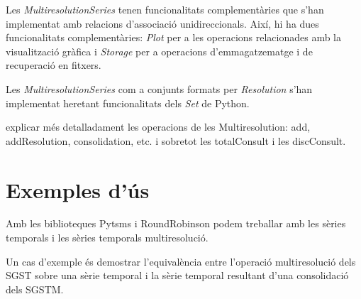 Les \emph{MultiresolutionSeries} tenen funcionalitats complementàries
que s'han implementat amb relacions d'associació
unidireccionals. Així, hi ha dues funcionalitats complementàries:
\emph{Plot} per a les operacions relacionades amb la visualització
gràfica i \emph{Storage} per a operacions d'emmagatzematge i de
recuperació en fitxers.



Les \emph{MultiresolutionSeries} com a conjunts formats per
\emph{Resolution} s'han implementat heretant funcionalitats dels
\emph{Set} de Python.

\todo{}
explicar més detalladament les operacions de les Multiresolution: add, addResolution, consolidation, etc. i sobretot les totalConsult i les discConsult.





\section{Exemples d'ús}


\todo{}


Amb les biblioteques Pytsms i RoundRobinson podem treballar amb les sèries temporals i les sèries temporals multiresolució. 

Un cas d'exemple és demostrar l'equivalència entre l'operació multiresolució dels SGST sobre una sèrie temporal i la sèrie temporal resultant d'una consolidació dels SGSTM. 












